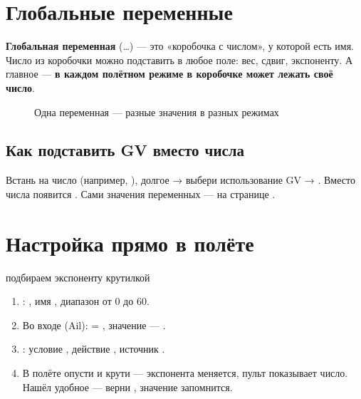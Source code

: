 \section{Глобальные переменные}

\begin{simple}
\textbf{Глобальная переменная} (…) --- это «коробочка с числом», у которой есть
имя. Число из коробочки можно подставить в любое поле: вес, сдвиг, экспоненту. А главное ---
\textbf{в каждом полётном режиме в коробочке может лежать своё число}.
\end{simple}

\begin{figure}[H]
\centering
{}
\caption{Одна переменная --- разные значения в разных режимах}
\end{figure}

\subsection{Как подставить GV вместо числа}

Встань на число (например, ), долгое  → выбери использование GV →
. Вместо числа появится . Сами значения переменных --- на странице
.

\section{Настройка прямо в полёте}

\begin{recipe}{подбираем экспоненту крутилкой}
\begin{enumerate}
  \item {}: , имя , диапазон от 0 до 60.
  \item Во входе  (Ail):  = , значение --- .
  \item {}: условие , действие ,
        источник .
  \item В полёте опусти  и крути  --- экспонента меняется, пульт показывает число.
        Нашёл удобное --- верни , значение запомнится.
\end{enumerate}
\end{recipe}

